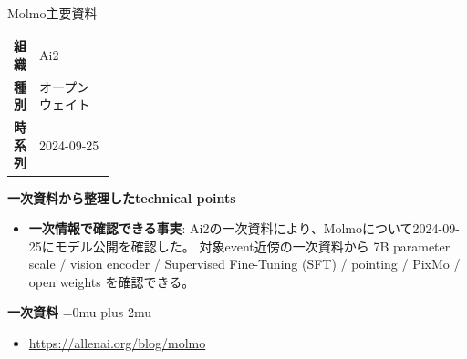 \begin{technicalnote}{Molmo}{主要資料}
\begingroup
\begin{tabularx}{\linewidth}{@{}>{\bfseries}p{0.22\linewidth}X@{}}
組織 & Ai2 \\
種別 & オープンウェイト \\
時系列 & 2024-09-25 \\
\end{tabularx}
\smallskip
{\bfseries 一次資料から整理したtechnical points}
\begin{itemize}[leftmargin=1.5em,itemsep=0.35em]
\item \textbf{一次情報で確認できる事実}: Ai2の一次資料により、Molmoについて2024-09-25にモデル公開を確認した。 対象event近傍の一次資料から 7B parameter scale / vision encoder / Supervised Fine-Tuning (SFT) / pointing / PixMo / open weights を確認できる。
\end{itemize}
\begin{minipage}{\linewidth}
\begin{samepage}
{\bfseries 一次資料}
\begingroup\sloppy
\Urlmuskip=0mu plus 2mu\relax
\begin{itemize}[leftmargin=1.5em,itemsep=0.25em]
\item {\scriptsize\url{https://allenai.org/blog/molmo}}
\end{itemize}
\endgroup
\end{samepage}
\end{minipage}
\endgroup
\end{technicalnote}
\medskip

